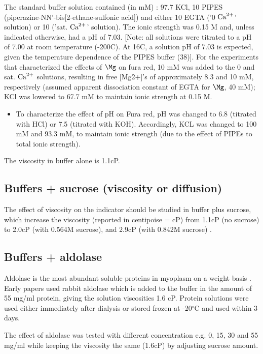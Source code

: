 The standard buffer solution contained (in mM) \citep{kurebayashi1993}: 97.7
KCl, 10 PIPES (piperazine-NN'-bis[2-ethane-sulfonic acid]) and either 10 EGTA
('0 ${\text{Ca}^{2+}}$' solution) or 10  ('sat. ${\text{Ca}^{2+}}$' solution). The ionic
strength was 0.15 M and, unless indicated otherwise, had a pH of 7.03. [Note:
all solutions were titrated to a pH of 7.00 at room temperature (-200C). At 16C,
a solution pH of 7.03 is expected, given the temperature dependence of the PIPES
buffer (38)].
For the experiments that characterized the effects of $\Mg$  on fura red, 10 mM
 was added to the 0 and sat. ${\text{Ca}^{2+}}$ solutions, resulting in free
[Mg2+]'s of approximately 8.3 and 10 mM, respectively (assumed apparent
dissociation constant of EGTA for $\Mg$, 40 mM); KCl was lowered to 67.7 mM to
maintain ionic strength at 0.15 M.
\begin{itemize}
  \item To characterize the effect of pH on Fura red, pH was changed to 6.8
  (titrated with HCl) or 7.5 (titrated with KOH). Accordingly, KCL was changed
  to 100 mM and 93.3 mM, to maintain ionic strength  (due to the effect
  of PIPEs to total ionic strength).
\end{itemize}

The viscosity in buffer alone is 1.1cP.

\subsection{Buffers + sucrose (viscosity or diffusion)}

The effect of viscosity on the indicator should be studied in buffer plus
sucrose, which increase the viscosity (reported in centipoise = cP) from 1.1cP
(no sucrose) to 2.0cP (with 0.564M sucrose), and 2.9cP (with 0.842M sucrose)
\citep{kurebayashi1993}.

\subsection{Buffers + aldolase}

Aldolase is the most abundant soluble proteins in myoplasm on a weight basis
\citep{ottaway1977}. Early papers used rabbit aldolase \citep{kurebayashi1993}
which is added to the buffer in the amount of 55 mg/ml protein, giving the
solution viscosities 1.6 cP. Protein solutions were used either immediately
after dialysis or stored frozen at -20$^\circ$C and used within 3 days.

The effect of aldolase was tested with different concentration e.g. 0, 15, 30
and 55 mg/ml while keeping the viscosity the same (1.6cP) by adjusting sucrose
amount.


